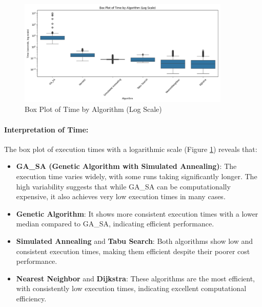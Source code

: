 \documentclass[
]{article}
\begin{document}
    \begin{figure}[h!]
        \centering
        \includegraphics[width=0.9\textwidth]{algo_summary/boxplot_time_log_scale}
        \caption{Box Plot of Time by Algorithm (Log Scale)}
        \label{fig:boxplot_time_log_scale}
    \end{figure}

    \paragraph{Interpretation of Time:}
    The box plot of execution times with a logarithmic scale (Figure \ref{fig:boxplot_time_log_scale}) reveals that:
    \begin{itemize}
        \item \textbf{GA\_SA (Genetic Algorithm with Simulated Annealing)}: The execution time varies widely, with some runs taking significantly longer. The high variability suggests that while GA\_SA can be computationally expensive, it also achieves very low execution times in many cases.
        \item \textbf{Genetic Algorithm}: It shows more consistent execution times with a lower median compared to GA\_SA, indicating efficient performance.
        \item \textbf{Simulated Annealing} and \textbf{Tabu Search}: Both algorithms show low and consistent execution times, making them efficient despite their poorer cost performance.
        \item \textbf{Nearest Neighbor} and \textbf{Dijkstra}: These algorithms are the most efficient, with consistently low execution times, indicating excellent computational efficiency.
    \end{itemize}
\end{document}
